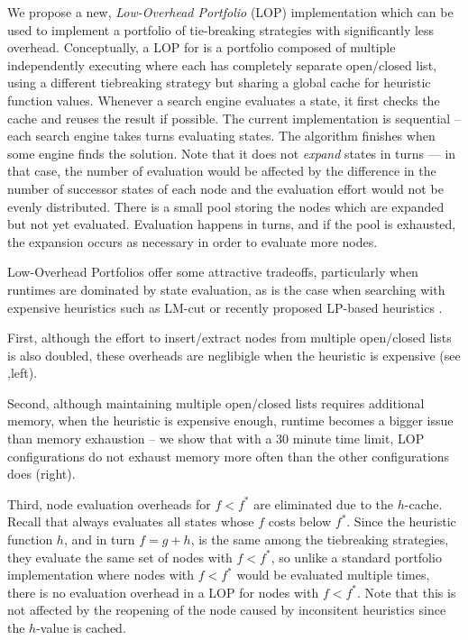 We propose a new, \emph{Low-Overhead Portfolio} (LOP) implementation which can be used to implement a portfolio of tie-breaking strategies with significantly less overhead.
% 
Conceptually, a LOP for \astar is a portfolio composed of multiple
independently executing \astar where each \astar has completely separate
open/closed list, using a different tiebreaking strategy but sharing a
global cache for heuristic function values. Whenever a search engine
evaluates a state, it first checks the cache and reuses the result if
possible.  The current implementation is sequential -- each search
engine takes turns evaluating states. The algorithm finishes when some
engine finds the solution. Note that it does not \emph{expand} states in
turns --- in that case, the number of evaluation would be affected by
the difference in the number of successor states of each node and the
evaluation effort would not be evenly distributed. There is a small pool
storing the nodes which are expanded but not yet evaluated. Evaluation
happens in turns, and if the pool is exhausted, the expansion occurs as
necessary in order to evaluate more nodes.

Low-Overhead Portfolios offer some attractive tradeoffs,
particularly when runtimes are dominated by state evaluation, as is the case when searching with 
expensive heuristics such as LM-cut or recently proposed LP-based heuristics \cite{PommereningRHB14,ImaiF14}.

First, although the effort to insert/extract nodes from multiple open/closed lists is also doubled, these overheads
are neglibigle when the heuristic is expensive (see ,left).

Second, although maintaining multiple open/closed lists requires additional memory,
when the heuristic is expensive enough, runtime becomes a bigger issue
than memory exhaustion  -- we show that with a 30 minute time limit, LOP
configurations do not exhaust memory more often than the other
configurations does (right).

Third, node evaluation overheads for $f < f^*$ are eliminated due to the $h$-cache.
Recall that \astar always evaluates all states whose $f$ costs 
below $f^*$. Since the heuristic function $h$, and in turn $f=g+h$, is
the same among the tiebreaking strategies, they evaluate the same set of
nodes with $f<f^*$, so unlike a standard portfolio implementation where 
nodes with $f<f^*$ would be evaluated multiple times, there is no evaluation overhead in a LOP
for nodes with $f<f^*$.
Note that this is not
affected by the reopening of the node caused by inconsitent heuristics
since the $h$-value is cached.

